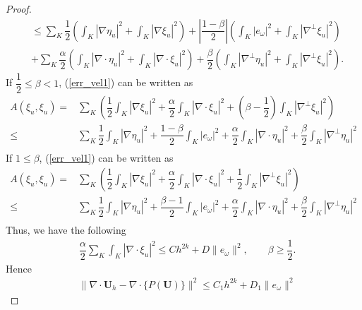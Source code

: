 \documentclass[11pt]{article}
\begin{document}
\begin{proof}
\begin{equation*}
\begin{aligned}
 &\leq \sum_K \dfrac{1}{2}\left({\int_K |\nabla \eta_u|^2 +\int_K |\nabla \xi_u|^2 }\right)+ \left|{\dfrac{1-\beta}{2}}\right|\left({\int_K |e_\omega|^2+\int_K |\nabla^\bot \xi_u|^2}\right)\\
&+\sum_K \dfrac{\alpha}{2}\left({\int_K |\nabla\cdot \eta_u|^2+\int_K |\nabla\cdot \xi_u|^2}\right)+\dfrac{\beta}{2} \left({\int_K |\nabla^\bot \eta_u|^2+\int_K |\nabla^\bot \xi_u|^2}\right).
\end{aligned}
\end{equation*}
If $\dfrac{1}{2}\leq\beta <1$, (\ref{err_vel1}) can be written as
\begin{equation*}
\begin{aligned}
A(\xi_u,\xi_u)=&\sum_{K}\left({
\dfrac{1}{2}\int_K |\nabla\xi_u|^2 + \dfrac{\alpha}{2} \int_K |\nabla\cdot \xi_u|^2 + \left({\beta-\dfrac{1}{2}}\right) \int_K |\nabla^\bot \xi_u|^2}\right)\\
\leq &\sum_K \dfrac{1}{2}\int_K |\nabla \eta_u|^2 + \dfrac{1-\beta}{2}\int_K |e_\omega|^2+\dfrac{\alpha}{2}\int_K |\nabla\cdot \eta_u|^2+\dfrac{\beta}{2}\int_K |\nabla^\bot \eta_u|^2\\
\end{aligned}
\end{equation*}
If $1\leq\beta $, (\ref{err_vel1}) can be written as
\begin{equation*}
\begin{aligned}
A(\xi_u,\xi_u)=&\sum_{K}\left({
\dfrac{1}{2}\int_K |\nabla\xi_u|^2 + \dfrac{\alpha}{2} \int_K |\nabla\cdot \xi_u|^2 + \dfrac{1}{2} \int_K |\nabla^\bot \xi_u|^2}\right)\\
\leq &\sum_K \dfrac{1}{2}\int_K |\nabla \eta_u|^2 + \dfrac{\beta-1}{2}\int_K |e_\omega|^2+\dfrac{\alpha}{2}\int_K |\nabla\cdot \eta_u|^2+\dfrac{\beta}{2}\int_K |\nabla^\bot \eta_u|^2\\
\end{aligned}
\end{equation*}
Thus, we have the following
\begin{equation*}
\begin{aligned}
&\dfrac{\alpha}{2} \sum_{K}\int_K |\nabla\cdot \xi_u|^2
\leq
Ch^{2k} + D \|e_\omega\|^2, \qquad \beta \geq \dfrac{1}{2}.
\end{aligned}
\end{equation*}
Hence 
\begin{equation}\label{err_div}
\begin{aligned}
&\|\nabla\cdot \textbf{U}_h-\nabla\cdot \lbrace P(\textbf{U})\rbrace\|^2
\leq
C_1 h^{2k} + D_1 \|e_\omega\|^2

\end{aligned}
\end{equation}
\end{proof}
\end{document}

